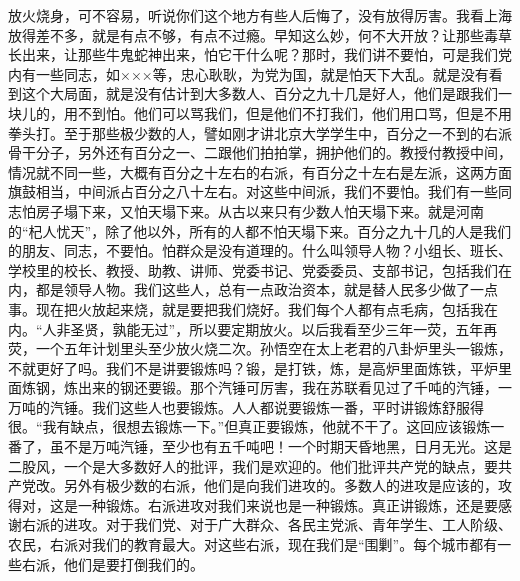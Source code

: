 放火烧身，可不容易，听说你们这个地方有些人后悔了，没有放得厉害。我看上海放得差不多，就是有点不够，有点不过瘾。早知这么妙，何不大开放？让那些毒草长出来，让那些牛鬼蛇神出来，怕它干什么呢？那时，我们讲不要怕，可是我们党内有一些同志，如×××等，忠心耿耿，为党为国，就是怕天下大乱。就是没有看到这个大局面，就是没有估计到大多数人、百分之九十几是好人，他们是跟我们一块儿的，用不到怕。他们可以骂我们，但是他们不打我们，他们用口骂，但是不用拳头打。至于那些极少数的人，譬如刚才讲北京大学学生中，百分之一不到的右派骨干分子，另外还有百分之一、二跟他们拍拍掌，拥护他们的。教授付教授中间，情况就不同一些，大概有百分之十左右的右派，有百分之十左右是左派，这两方面旗鼓相当，中间派占百分之八十左右。对这些中间派，我们不要怕。我们有一些同志怕房子塌下来，又怕天塌下来。从古以来只有少数人怕天塌下来。就是河南的“杞人忧天”，除了他以外，所有的人都不怕天塌下来。百分之九十几的人是我们的朋友、同志，不要怕。怕群众是没有道理的。什么叫领导人物？小组长、班长、学校里的校长、教授、助教、讲师、党委书记、党委委员、支部书记，包括我们在内，都是领导人物。我们这些人，总有一点政治资本，就是替人民多少做了一点事。现在把火放起来烧，就是要把我们烧好。我们每个人都有点毛病，包括我在内。“人非圣贤，孰能无过”，所以要定期放火。以后我看至少三年一荧，五年再荧，一个五年计划里头至少放火烧二次。孙悟空在太上老君的八卦炉里头一锻炼，不就更好了吗。我们不是讲要锻炼吗？锻，是打铁，炼，是高炉里面炼铁，平炉里面炼钢，炼出来的钢还要锻。那个汽锤可厉害，我在苏联看见过了千吨的汽锤，一万吨的汽锤。我们这些人也要锻炼。人人都说要锻炼一番，平时讲锻炼舒服得很。“我有缺点，很想去锻炼一下。”但真正要锻炼，他就不干了。这回应该锻炼一番了，虽不是万吨汽锤，至少也有五千吨吧！一个时期天昏地黑，日月无光。这是二股风，一个是大多数好人的批评，我们是欢迎的。他们批评共产党的缺点，要共产党改。另外有极少数的右派，他们是向我们进攻的。多数人的进攻是应该的，攻得对，这是一种锻炼。右派进攻对我们来说也是一种锻炼。真正讲锻炼，还是要感谢右派的进攻。对于我们党、对于广大群众、各民主党派、青年学生、工人阶级、农民，右派对我们的教育最大。对这些右派，现在我们是“围剿”。每个城市都有一些右派，他们是要打倒我们的。

